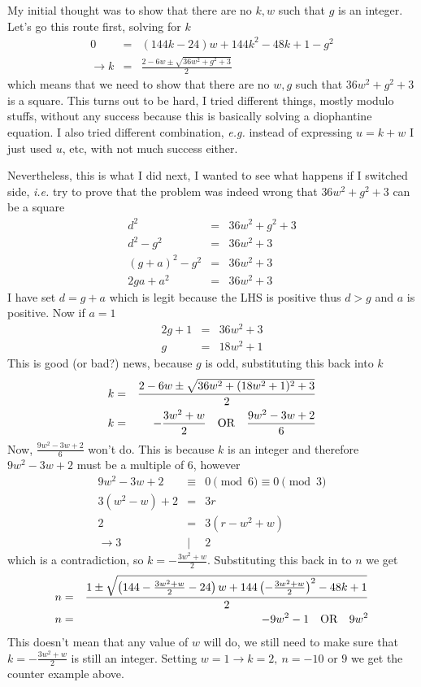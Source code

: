 \documentclass[aps,preprint,preprintnumbers,nofootinbib,showpacs,prd]{revtex4-1}
\newcommand{\ie}{{\it i.e.} }
\newcommand{\eg}{{\it e.g.} }
\newcommand{\nbea}{\begin{eqnarray*}}
\newcommand{\neea}{\end{eqnarray*}}
\begin{document}
My initial thought was to show that there are no $k, w$ such that $g$ is an integer. Let's go this route first, solving for $k$
%
\nbea
0 & = & (144k-24)w+144k^2-48k+1 - g^2 \\
\to k & = & \frac{2 - 6w \pm \sqrt{36w^2+g^2+3}}{2}
\neea
%
which means that we need to show that there are no $w, g$ such that $36w^2+g^2+3$ is a square. This turns out to be hard, I tried different things, mostly modulo stuffs, without any success because this is basically solving a diophantine equation. I also tried different combination, \eg instead of expressing $u = k + w$ I just used $u$, etc, with not much success either.

Nevertheless, this is what I did next, I wanted to see what happens if I switched side, \ie try to prove that the problem was indeed wrong that $36w^2+g^2+3$ can be a square
%
\nbea
d^2 & = &  36w^2+g^2+3 \\
d^2 - g^2 & = & 36w^2 + 3 \\
(g + a)^2 - g^2 & = & 36w^2 + 3 \\
2ga + a^2 & = & 36w^2 + 3
\neea
%
I have set $d = g + a$ which is legit because the LHS is positive thus $d > g$ and $a$ is positive. Now if $a = 1$
%
\nbea
2g + 1 & = & 36w^2 + 3 \\
g & = & 18w^2 + 1
\neea
%
This is good (or bad?) news, because $g$ is odd, substituting this back into $k$
%
\nbea
k & = & \frac{2 - 6w \pm \sqrt{36w^2+(18w^2 + 1)^2+3}}{2} \\
k & = & -\frac{3w^2+w}{2} ~~~{\rm OR}~~~ \frac{9w^2-3w+2}{6}
\neea
%
Now, $\frac{9w^2-3w+2}{6}$ won't do. This is because $k$ is an integer and therefore $9w^2-3w+2$ must be a multiple of $6$, however
%
\nbea
9w^2-3w+2 & \equiv & 0 \pmod{6} \equiv 0 \pmod{3} \\
3(w^2 - w) + 2 & = & 3r \\
2 & = & 3(r - w^2 + w) \\
\to 3 & | & 2
\neea
%
which is a contradiction, so $k = -\frac{3w^2+w}{2}$. Substituting this back in to $n$ we get
%
\nbea
n & = & \frac{1 \pm \sqrt{\left (144-\frac{3w^2+w}{2}-24 \right )w+144\left (-\frac{3w^2+w}{2} \right)^2-48k+1}}{2} \\
n & = & -9w^2-1 ~~~{\rm OR} ~~~ 9w^2
\neea
%
This doesn't mean that any value of $w$ will do, we still need to make sure that $k = -\frac{3w^2+w}{2}$ is still an integer. Setting $w = 1 \to k = 2, ~n = -10$ or $9$ we get the counter example above.
\end{document}
